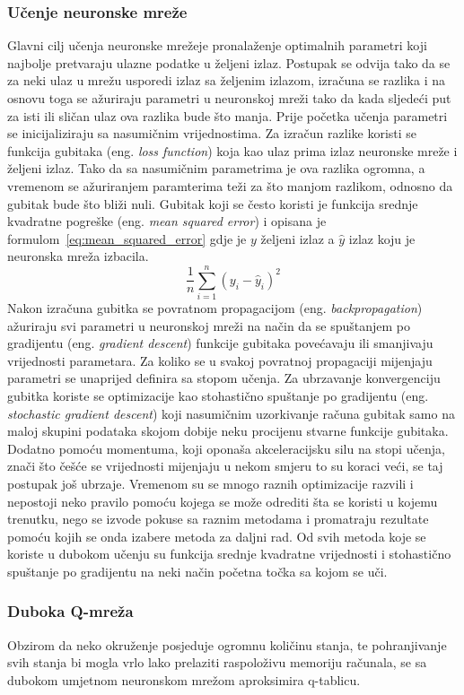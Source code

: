 \subsubsection{Učenje neuronske mreže}
Glavni cilj učenja neuronske mrežeje pronalaženje optimalnih parametri koji najbolje pretvaraju ulazne podatke u željeni izlaz. Postupak se odvija tako da se za neki ulaz u mrežu usporedi izlaz sa željenim izlazom, izračuna se razlika i na osnovu toga se ažuriraju parametri u neuronskoj mreži tako da kada sljedeći put za isti ili sličan ulaz ova razlika bude što manja. Prije početka učenja parametri se inicijaliziraju sa nasumičnim vrijednostima. Za izračun razlike koristi se funkcija gubitaka (eng. \textit{loss function}) koja kao ulaz prima izlaz neuronske mreže i željeni izlaz. Tako da sa nasumičnim parametrima je ova razlika ogromna, a vremenom se ažuriranjem paramterima teži za što manjom razlikom, odnosno da gubitak bude što bliži nuli. Gubitak koji se često koristi je funkcija srednje kvadratne pogreške (eng. \textit{mean squared error}) i opisana je formulom~\ref{eq:mean_squared_error} gdje je $y$ željeni izlaz a $\hat{y}$ izlaz koju je neuronska mreža izbacila. 
\begin{equation}\label{eq:mean_squared_error}
\frac{1}{n}\sum_{i=1}^{n}(y_i - \hat{y}_i)^2
\end{equation}
Nakon izračuna gubitka se povratnom propagacijom (eng. \textit{backpropagation}) ažuriraju svi parametri u neuronskoj mreži na način da se spuštanjem po gradijentu (eng. \textit{gradient descent}) funkcije gubitaka povećavaju ili smanjivaju vrijednosti parametara. Za koliko se u svakoj povratnoj propagaciji mijenjaju parametri se unaprijed definira sa stopom učenja. Za ubrzavanje konvergenciju gubitka koriste se optimizacije kao stohastično spuštanje po gradijentu (eng. \textit{stochastic gradient descent}) koji nasumičnim uzorkivanje računa gubitak samo na maloj skupini podataka skojom dobije neku procijenu stvarne funkcije gubitaka. Dodatno pomoću momentuma, koji oponaša akceleracijsku silu na stopi učenja, znači što češće se vrijednosti mijenjaju u nekom smjeru to su koraci veći, se taj postupak još ubrzaje. Vremenom su se mnogo raznih optimizacije razvili i nepostoji neko pravilo pomoću kojega se može odrediti šta se koristi u kojemu trenutku, nego se izvode pokuse sa raznim metodama i promatraju rezultate pomoću kojih se onda izabere metoda za daljni rad. Od svih metoda koje se koriste u dubokom učenju su funkcija srednje kvadratne vrijednosti i stohastično spuštanje po gradijentu na neki način početna točka sa kojom se uči.

\subsubsection{Duboka Q-mreža}
Obzirom da neko okruženje posjeduje ogromnu količinu stanja, te pohranjivanje svih stanja bi mogla vrlo lako prelaziti raspoloživu memoriju računala, se sa dubokom umjetnom neuronskom mrežom aproksimira q-tablicu.
